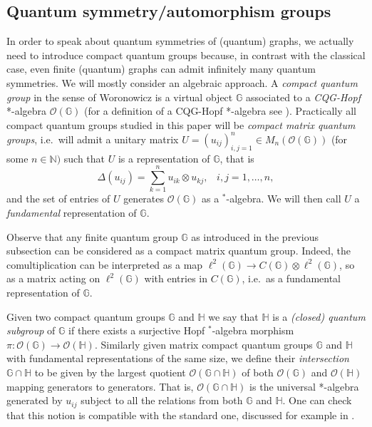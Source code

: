 \documentclass[12pt]{amsart}
\theoremstyle{definition}
\theoremstyle{definition}
\theoremstyle{definition}
\theoremstyle{definition}
\newcommand{\G}{\mathbb{G}}
\newcommand{\Hb}{\mathbb{H}}
\newcommand{\N}{\mathbb{N}}
\newcommand{\cO}{\mathcal{O}}
\numberwithin{equation}{section}
\begin{document}
\subsection{Quantum symmetry/automorphism groups}


In order to speak about quantum symmetries of (quantum) graphs, we actually need to introduce compact quantum groups because, in contrast with the classical case, even finite (quantum) graphs can admit infinitely many quantum symmetries. We will mostly consider an algebraic approach. A \emph{compact quantum group} in the sense of Woronowicz is a virtual object $\G$ associated to a \emph{CQG-Hopf} *-algebra $\cO(\G)$ (for a definition of a CQG-Hopf *-algebra see \cite{DiK94}). 
Practically all compact quantum groups studied in this paper will be \emph{compact matrix quantum groups}, i.e.\ will admit a unitary matrix $U=(u_{ij})_{i,j=1}^n \in M_n(\cO(\G))$ (for some $n \in \N)$ such that $U$ is a representation of $\G$, that is 
\[ \Delta(u_{ij}) = \sum_{k=1}^n u_{ik} \otimes u_{kj}, \;\;\; i, j=1, \ldots, n,\]
and the set of entries of $U$ generates $\cO(\G)$ as a $^*$-algebra. We will then call $U$ a \emph{fundamental} representation of $\G$.

Observe that any finite quantum group $\G$ as introduced in the previous subsection can be considered as a compact matrix quantum group. Indeed, the comultiplication can be interpreted as a map $\ell^2(\G)\to C(\G)\otimes \ell^2(\G)$, so as a matrix acting on $\ell^2(\G)$ with entries in $C(\G)$, i.e.\ as a fundamental representation of $\G$.


Given two compact quantum groups $\G$ and $\Hb$ we say that $\Hb$ is a \emph{(closed) quantum subgroup} of $\G$ if there exists a surjective Hopf $^*$-algebra morphism $\pi: \cO(\G)\to \cO(\Hb)$.
Similarly given matrix compact quantum groups $\G$ and $\Hb$ with fundamental representations of the same size, we define their \emph{intersection} $\G\cap\Hb$ to be given by the largest quotient $\cO(\G\cap\Hb)$ of both $\cO(\G)$ and $\cO(\Hb)$ mapping generators to generators. That is, $\cO(\G\cap\Hb)$ is the universal *-algebra generated by $u_{ij}$ subject to all the relations from both $\G$ and $\Hb$. One can check that this notion is compatible with the standard one, discussed for example
in \cite{CHK17}.
\end{document}
